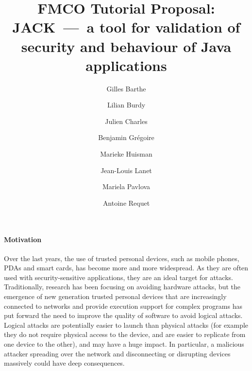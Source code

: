 \documentclass[]{llncs}
\title{FMCO Tutorial Proposal:\\
JACK~---~a tool for validation of security and behaviour of Java applications}
\author{Gilles Barthe\inst{1} \and
        Lilian Burdy\inst{1} \and
        Julien Charles\inst{1} \and
        Benjamin Gr\'egoire\inst{1} \and
        Marieke Huisman\inst{1} \and
        Jean-Louis Lanet\inst{2} \and
        Mariela Pavlova\inst{1} \and
        Antoine Requet\inst{2}}
\institute{INRIA Sophia Antipolis, France \and Gemplus, France}
\begin{document}
\maketitle




\paragraph{Motivation}
Over the last years, the use of trusted personal devices, such as
mobile phones, PDAs and smart cards, has become more and more
widespread. As they are often used with security-sensitive
applications, they are an ideal target for attacks. Traditionally,
research has been focusing on avoiding hardware attacks, but the
emergence of new generation trusted personal devices that are
increasingly connected to networks and provide execution support for
complex programs has put forward the need to improve the quality of
software to avoid logical attacks.  Logical attacks are potentially
easier to launch than physical attacks (for example they do not
require physical access to the device, and are easier to replicate
from one device to the other), and may have a huge impact.  In
particular, a malicious attacker spreading over the network and
disconnecting or disrupting devices massively could have deep
consequences.
\end{document}
